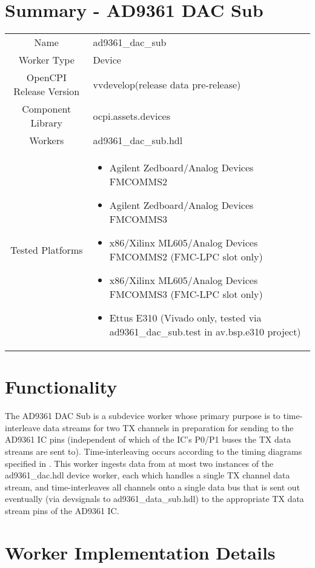 \documentclass{article}
\author{} %
\date{Version \docVersion} %
\title{\docTitle}
\def\docVersion{\color{red}vdevelop}
\def\comp{ad9361\_dac\_sub}
\def\Comp{AD9361 DAC Sub}
\begin{document}
\section*{Summary - \Comp}
\begin{tabular}{|c|M{13.5cm}|}
	\hline
	                  &                  \\
	\hline
	Name              & \comp            \\
	\hline
	Worker Type       & Device           \\
	\hline
	OpenCPI Release Version & v\docVersion (release data \color{red}pre-release) \\
	\hline
	Component Library & ocpi.assets.devices     \\
	\hline
	Workers           & \comp.hdl        \\
	\hline
	Tested Platforms  &
\begin{itemize}
  \item Agilent Zedboard/Analog Devices FMCOMMS2
  \item Agilent Zedboard/Analog Devices FMCOMMS3
  \item x86/Xilinx ML605/Analog Devices FMCOMMS2 (FMC-LPC slot only)
  \item x86/Xilinx ML605/Analog Devices FMCOMMS3 (FMC-LPC slot only)
  \item Ettus E310 (Vivado only, tested via \comp{}.test in av.bsp.e310 project)
\end{itemize} \\
	\hline
\end{tabular}

\section*{Functionality}
	The \Comp{} is a subdevice worker whose primary purpose is to time-interleave data streams for two TX channels in preparation for sending to the AD9361 IC pins (independent of which of the IC's P0/P1 buses the TX data streams are sent to). Time-interleaving occurs according to the timing diagrams specified in \cite{adi_ug570}. This worker ingests data from at most two instances of the ad9361\_dac.hdl device worker, each which handles a single TX channel data stream, and time-interleaves all channels onto a single data bus that is sent out eventually (via devsignals to ad9361\_data\_sub.hdl\cite{data_sub_comp_datasheet}) to the appropriate TX data stream pins of the AD9361 IC\cite{ad9361}.

\section*{Worker Implementation Details}
\end{document}
